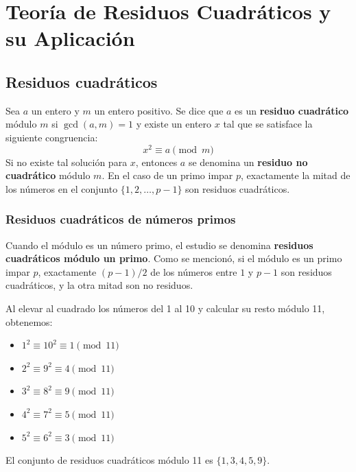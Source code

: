 \chapter{Teoría de Residuos Cuadráticos y su Aplicación}
\section{Residuos cuadráticos}
Sea $a$ un entero y $m$ un entero positivo. Se dice que $a$ es un \textbf{residuo cuadrático} módulo $m$ si $\gcd(a, m) = 1$ y existe un entero $x$ tal que se satisface la siguiente congruencia:
\begin{equation}
    x^2 \equiv a \pmod{m}
\end{equation}
Si no existe tal solución para $x$, entonces $a$ se denomina un \textbf{residuo no cuadrático} módulo $m$. En el caso de un primo impar $p$, exactamente la mitad de los números en el conjunto $\{1, 2, \dots, p-1\}$ son residuos cuadráticos.

\subsection{Residuos cuadráticos de números primos}
Cuando el módulo es un número primo, el estudio se denomina \textbf{residuos cuadráticos módulo un primo}. Como se mencionó, si el módulo es un primo impar $p$, exactamente $(p-1)/2$ de los números entre $1$ y $p-1$ son residuos cuadráticos, y la otra mitad son no residuos.

\begin{ejemplo}
\end{ejemplo}
\begin{solucion}
Al elevar al cuadrado los números del 1 al 10 y calcular su resto módulo 11, obtenemos:

\begin{itemize}
    \item $1^2 \equiv 10^2 \equiv 1 \pmod{11}$
    \item $2^2 \equiv 9^2 \equiv 4 \pmod{11}$
    \item $3^2 \equiv 8^2 \equiv 9 \pmod{11}$
    \item $4^2 \equiv 7^2 \equiv 5 \pmod{11}$
    \item $5^2 \equiv 6^2 \equiv 3 \pmod{11}$
\end{itemize}
El conjunto de residuos cuadráticos módulo 11 es $\{1, 3, 4, 5, 9\}$.
\end{solucion}

